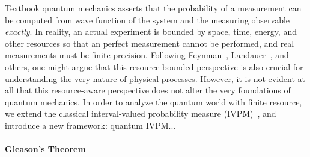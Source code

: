 \documentclass[english,reprint, aps, prl,superscriptaddress, showpacs,
showkeys]{revtex4-1}
\theoremstyle{plain}
\theoremstyle{definition}
\begin{document}

\maketitle

Textbook quantum mechanics asserts that the probability of a measurement
can be computed from wave function of the system and the measuring
observable \emph{exactly}. In reality, an actual experiment is bounded
by space, time, energy, and other resources so that an perfect measurement
cannot be performed, and real measurements must be finite precision.
Following Feynman~\cite{Feynman1982Simulating}, Landauer~\cite{Landauer1996188},
and others, one might argue that this resource-bounded perspective
is also crucial for understanding the very nature of physical processes.
However, it is not evident at all that this resource-aware perspective
does not alter the very foundations of quantum mechanics. In order
to analyze the quantum world with finite resource, we extend the classical
interval-valued probability measure (IVPM)~\cite{JamisonLodwick2004},
and introduce a new framework: quantum IVPM...\newpage{}

\paragraph{Gleason's Theorem}
\end{document}
